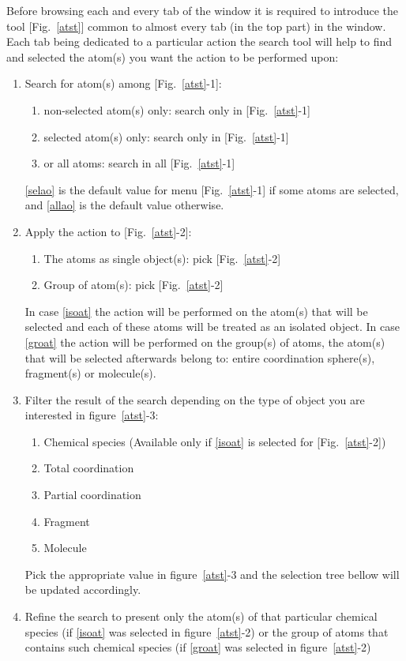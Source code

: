 Before browsing each and every tab of the  window it is required to introduce the  tool [Fig.~\ref{atst}] 
common to almost every tab (in the top part) in the window. 
Each tab being dedicated to a particular action the search tool will help to find and selected the atom(s) you want the action to be performed upon: \\
\begin{enumerate}
\item\label{sel} Search for atom(s) among [Fig.~\ref{atst}-1]: 
\begin{enumerate}
\item non-selected atom(s) only: search only in  [Fig.~\ref{atst}-1] 
\item\label{selao} selected atom(s) only: search only in  [Fig.~\ref{atst}-1] 
\item\label{allao} or all atoms: search in all  [Fig.~\ref{atst}-1] 
\end{enumerate}
\ref{selao} is the default value for menu [Fig.~\ref{atst}-1] if some atoms are selected, and \ref{allao} is the default value otherwise. 
\item\label{for} Apply the action to [Fig.~\ref{atst}-2]:
\begin{enumerate}
\item\label{isoat} The atoms as single object(s): pick  [Fig.~\ref{atst}-2]
\item\label{groat} Group of atom(s): pick  [Fig.~\ref{atst}-2]
\end{enumerate}
In case \ref{isoat} the action will be performed on the atom(s) that will be selected and each of these atoms will be treated as an isolated object. 
In case \ref{groat} the action will be performed on the group(s) of atoms, the atom(s) that will be selected afterwards belong to: entire coordination sphere(s), 
fragment(s) or molecule(s).
\item\label{fil} Filter the result of the search depending on the type of object you are interested in figure~\ref{atst}-3:
\begin{enumerate}
\item Chemical species (Available only if \ref{isoat} is selected for [Fig.~\ref{atst}-2])
\item Total coordination 
\item Partial coordination
\item Fragment
\item Molecule
\end{enumerate}
Pick the appropriate value in figure~\ref{atst}-3 and the selection tree bellow will be updated accordingly.
\item Refine the search to present only the atom(s) of that particular chemical species (if \ref{isoat} was selected in figure~\ref{atst}-2) 
or the group of atoms that contains such chemical species (if \ref{groat} was selected in figure~\ref{atst}-2)
\end{enumerate}

